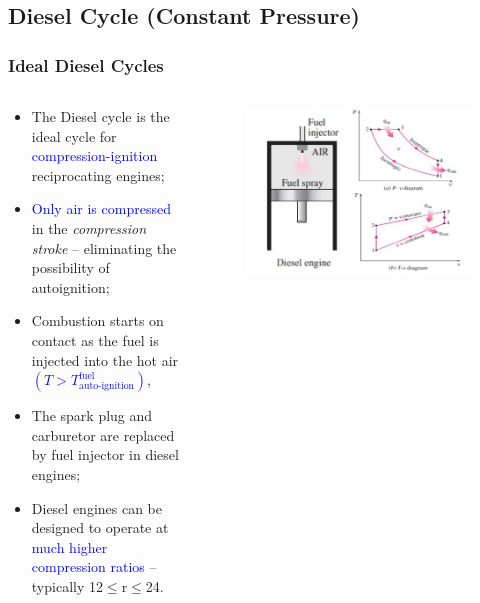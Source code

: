 \documentclass[10pt,compress]{beamer}
\begin{document}
\subsection{Diesel Cycle (Constant Pressure)}
\begin{frame}
 \frametitle{Ideal Diesel Cycles}
  \begin{columns}
   \begin{column}[c]{0.5\linewidth}
    \begin{itemize}
     \item <1-> The Diesel cycle is the ideal cycle for \textcolor{blue}{compression-ignition} reciprocating engines;
     \item <2-> \textcolor{blue}{Only air is compressed} in the {\it compression stroke} -- eliminating the possibility of autoignition;
     \item <3-> Combustion starts on contact as the fuel is injected into the hot air \textcolor{blue}{$\left(T>T^{\text{fuel}}_{\text{auto-ignition}}\right)$}, 
     \item <4-> The spark plug and carburetor are replaced by fuel injector in diesel engines;
     \item <5-> Diesel engines can be designed to operate at \textcolor{blue}{much higher compression ratios} -- typically 12$\leq$r$\leq$24.
    \end{itemize}
   \end{column}
   \begin{column}[c]{0.5\linewidth}
    \begin{figure}%
     \begin{center}
      \includegraphics[width=6.cm,clip]{./Pics/InternalCombustion_IdealDieselCycle}
     \end{center}
    \end{figure}   
   \end{column}  
  \end{columns}
\end{frame}
\end{document}
